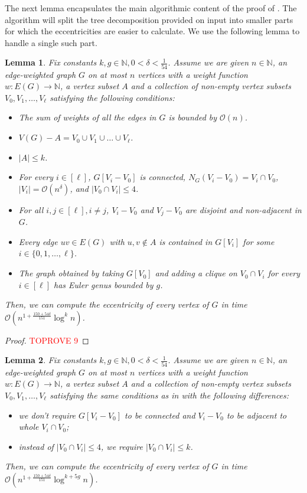 \documentclass[11pt,a4paper]{article}
\newtheorem{lemma}{Lemma}[section]
\newcommand{\Oh}{\mathcal{O}}
\renewcommand{\leq}{\leqslant}
\renewcommand{\setminus}{-}
\begin{document}
The next lemma encapsulates the main algorithmic content of the proof of . The algorithm will split the tree decomposition provided on input into smaller parts for which the eccentricities are easier to calculate. We use the following lemma to handle a single such part.
\begin{lemma}\label{l:star}
Fix constants $k, g \in \mathbb{N}, 0 < \delta < \frac{1}{54}$. Assume we are given $n \in \mathbb{N}$, an edge-weighted graph $G$ on at most $n$ vertices with a weight function $w \colon E(G) \to \mathbb{N}$, a vertex subset $A$ and a collection of non-empty vertex subsets $V_0, V_1, \dots, V_\ell$ satisfying the following conditions:
\begin{itemize}[nosep]
	\item The sum of weights of all the edges in $G$ is bounded by $\Oh(n)$.
	\item $V(G) \setminus A = V_0 \cup V_1 \cup \dots \cup V_\ell$.
	\item $|A| \leq k$.
	\item For every $i \in [\ell]$, $G[V_i \setminus V_0]$ is connected, $N_G(V_i \setminus V_0) = V_i \cap V_0$, $|V_i| = \Oh(n^\delta)$, and $|V_0 \cap V_i| \leq 4$.
	\item For all $i, j \in [\ell], i \neq j$, $V_i \setminus V_0$ and $V_j \setminus V_0$ are disjoint and non-adjacent in $G$.
	\item Every edge $uv \in E(G)$ with $u, v \not\in A$ is contained in $G[V_i]$ for some $i\in \{0,1,\ldots,\ell\}$.
	\item The graph obtained by taking $G[V_0]$ and adding a clique on $V_0 \cap V_i$ for every $i \in [\ell]$ has Euler genus bounded by $g$.
\end{itemize}
Then, we can compute the eccentricity of every vertex of $G$ in time $\Oh \left( n^{1 + \frac{150 + 54 \delta}{151}} \log^k n \right)$.
\end{lemma}

\begin{proof}\textcolor{red}{TOPROVE 9}\end{proof}


\begin{lemma}\label{l:star2}
Fix constants $k, g \in \mathbb{N}, 0 < \delta < \frac{1}{54}$. Assume we are given $n \in \mathbb{N}$, an edge-weighted graph $G$ on at most $n$ vertices with a weight function $w \colon E(G) \to \mathbb{N}$, a vertex subset $A$ and a collection of non-empty vertex subsets $V_0, V_1, \dots, V_\ell$ satisfying the same conditions as in  with the following differences:
\begin{itemize}
	\item we don't require $G[V_i - V_0]$ to be connected and $V_i - V_0$ to be adjacent to whole $V_i \cap V_0$;
	\item instead of $|V_0 \cap V_i| \leq 4$, we require $|V_0 \cap V_i| \leq k$.
\end{itemize}
Then, we can compute the eccentricity of every vertex of $G$ in time $\Oh \left( n^{1 + \frac{150 + 54 \delta}{151}} \log^{k + 5g} n \right)$.
\end{lemma}
\end{document}
